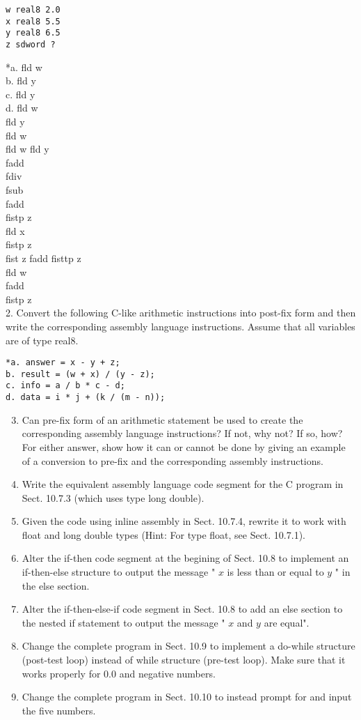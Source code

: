 \documentclass[10pt]{article}
\begin{document}
\begin{verbatim}
w real8 2.0
x real8 5.5
y real8 6.5
z sdword ?
\end{verbatim}

*a. fld w\\
b. fld y\\
c. fld y\\
d. fld w\\
fld y\\
fld w\\
fld w fld y\\
fadd\\
fdiv\\
fsub\\
fadd\\
fistp z\\
fld x\\
fistp z\\
fist z fadd fisttp z\\
fld w\\
fadd\\
fistp z\\
2. Convert the following C-like arithmetic instructions into post-fix form and then write the corresponding assembly language instructions. Assume that all variables are of type real8.

\begin{verbatim}
*a. answer = x - y + z;
b. result = (w + x) / (y - z);
c. info = a / b * c - d;
d. data = i * j + (k / (m - n));
\end{verbatim}

\begin{enumerate}
  \setcounter{enumi}{2}
  \item Can pre-fix form of an arithmetic statement be used to create the corresponding assembly language instructions? If not, why not? If so, how? For either answer, show how it can or cannot be done by giving an example of a conversion to pre-fix and the corresponding assembly instructions.
  \item Write the equivalent assembly language code segment for the C program in Sect. 10.7.3 (which uses type long double).
  \item Given the code using inline assembly in Sect. 10.7.4, rewrite it to work with float and long double types (Hint: For type float, see Sect. 10.7.1).
  \item Alter the if-then code segment at the begining of Sect. 10.8 to implement an if-then-else structure to output the message " $x$ is less than or equal to $y$ " in the else section.
  \item Alter the if-then-else-if code segment in Sect. 10.8 to add an else section to the nested if statement to output the message " $x$ and $y$ are equal".
  \item Change the complete program in Sect. 10.9 to implement a do-while structure (post-test loop) instead of while structure (pre-test loop). Make sure that it works properly for 0.0 and negative numbers.
  \item Change the complete program in Sect. 10.10 to instead prompt for and input the five numbers.
\end{enumerate}
\end{document}
